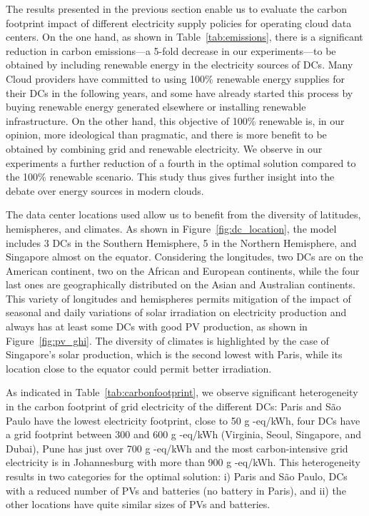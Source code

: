 The results presented in the previous section enable us to evaluate the carbon footprint impact of different electricity supply policies for operating cloud data centers. On the one hand, as shown in Table~\ref{tab:emissions}, there is a significant reduction in carbon emissions---a 5-fold decrease in our experiments---to be obtained by including renewable energy in the electricity sources of DCs. Many Cloud providers have committed to using 100\% renewable energy supplies for their DCs in the following years, and some have already started this process by buying renewable energy generated elsewhere or installing renewable infrastructure. On the other hand, this objective of 100\% renewable is, in our opinion, more ideological than pragmatic, and there is more benefit to be obtained by combining grid and renewable electricity. We observe in our experiments a further reduction of a fourth in the optimal solution compared to the 100\% renewable scenario. This study thus gives further insight into the debate over energy sources in modern clouds.

The data center locations used allow us to benefit from the diversity of latitudes, hemispheres, and climates. As shown in Figure~\ref{fig:dc_location}, the model includes 3 DCs in the Southern Hemisphere, 5 in the Northern Hemisphere, and Singapore almost on the equator. Considering the longitudes, two DCs are on the American continent, two on the African and European continents, while the four last ones are geographically distributed on the Asian and Australian continents. This variety of longitudes and hemispheres permits mitigation of the impact of seasonal and daily variations of solar irradiation on electricity production and always has at least some DCs with good PV production, as shown in Figure~\ref{fig:pv_ghi}. The diversity of climates is highlighted by the case of Singapore's solar production, which is the second lowest with Paris, while its location close to the equator could permit better irradiation.

As indicated in Table~\ref{tab:carbonfootprint}, we observe significant heterogeneity in the carbon footprint of grid electricity of the different DCs: Paris and S\~ao Paulo have the lowest electricity footprint, close to 50 g -eq/kWh, four DCs have a grid footprint between 300 and 600 g -eq/kWh (Virginia, Seoul, Singapore, and Dubai), Pune has just over 700 g -eq/kWh and the most carbon-intensive grid electricity is in Johannesburg with more than 900 g -eq/kWh. This heterogeneity results in two categories for the optimal solution: i) Paris and S\~ao Paulo, DCs with a reduced number of PVs and batteries (no battery in Paris), and ii) the other locations have quite similar sizes of PVs and batteries. 

